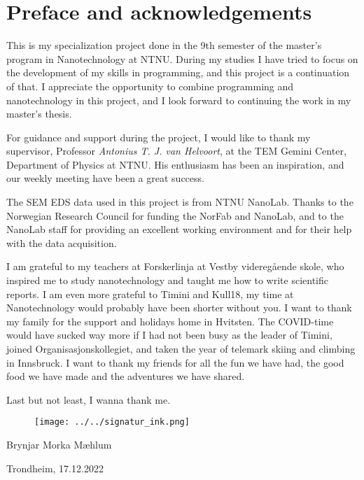 \chapter*{Preface and acknowledgements}


This is my specialization project done in the 9th semester of the master's program in Nanotechnology at NTNU.
During my studies I have tried to focus on the development of my skills in programming, and this project is a continuation of that.
I appreciate the opportunity to combine programming and nanotechnology in this project, and I look forward to continuing the work in my master's thesis.

For guidance and support during the project, I would like to thank my supervisor, Professor \textit{Antonius T. J. van Helvoort}, at the TEM Gemini Center, Department of Physics at NTNU.
His enthusiasm has been an inspiration, and our weekly meeting have been a great success.

The SEM EDS data used in this project is from NTNU NanoLab.
Thanks to the Norwegian Research Council for funding the NorFab and NanoLab, and to the NanoLab staff for providing an excellent working environment and for their help with the data acquisition.


I am grateful to my teachers at Forskerlinja at Vestby videregående skole, who inspired me to study nanotechnology and taught me how to write scientific reports.
I am even more grateful to Timini and Kull18, my time at Nanotechnology would probably have been shorter without you.
I want to thank my family for the support and holidays home in Hvitsten.
The COVID-time would have sucked way more if I had not been busy as the leader of Timini, joined Organisasjonskollegiet, and taken the year of telemark skiing and climbing in Innsbruck.
I want to thank my friends for all the fun we have had, the good food we have made and the adventures we have shared.

Last but not least, I wanna thank me.


\begin{figure}[ht]
    \texttt{[image: ../../signatur\_ink.png]}
    \label{fig:signatur}
\end{figure}

Brynjar Morka Mæhlum

Trondheim, 17.12.2022
